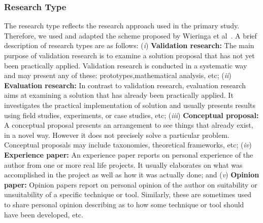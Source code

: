




\subsubsection{Research Type}\label{research_type}

The research type reflects the research approach used in the primary study. Therefore, we used and adapted the scheme proposed by Wieringa et al~\cite{Wieringa:2005:REP:1107677.1107683}. A brief description of research types are as follows: (\textit{i}) \textbf{Validation research:} The main purpose of validation research is to examine a solution proposal that has not yet been practically applied. Validation research is conducted in a systematic way and may present any of these: prototypes,mathematical analysis, etc; (\textit{ii}) \textbf{Evaluation research:} In contrast to validation research, evaluation research aims at examining a solution that has already been practically applied. It investigates the practical implementation of solution and usually presents results using field studies, experiments, or case studies, etc; (\textit{iii}) \textbf{Conceptual proposal:} A conceptual proposal presents an arrangement to see things that already exist, in a novel way. However it does not precisely solve a particular problem. Conceptual proposals may include taxonomies, theoretical frameworks, etc; (\textit{iv}) \textbf{Experience paper:} An experience paper reports on personal experience of the author from one or more real life projects. It usually elaborates on what was accomplished in the project as well as how it was actually done; and (\textit{v}) \textbf{Opinion paper:} Opinion papers report on personal opinion of the author on suitability or unsuitability of a specific technique or tool. Similarly, these are sometimes used to share personal opinion describing as to how some technique or tool should have been developed, etc.

